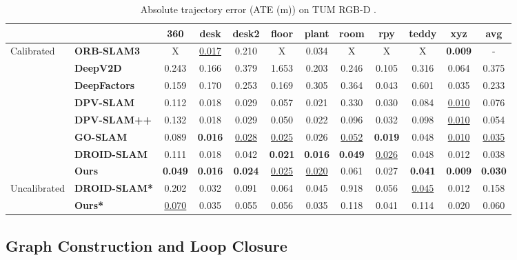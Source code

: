 \documentclass[10pt,twocolumn,letterpaper]{article}
\begin{document}
\begin{table}[t]
\centering
\caption{Absolute trajectory error (ATE (m)) on TUM RGB-D \cite{sturm_benchmark_2012}.}\label{tab:tum_ate}
\scriptsize
\begin{tabular}{l|lcccccccccc} %
& &\textbf{360} &\textbf{desk} &\textbf{desk2} &\textbf{floor} &\textbf{plant} &\textbf{room } &\textbf{rpy} &\textbf{teddy} &\textbf{xyz} &\textbf{avg} \\
\hline
\multirow{8}{*}{Calibrated} &\textbf{ORB-SLAM3 \cite{campos_orbslam3_2021}} &X &\underline{0.017} &0.210 &X &0.034 &X &X &X &\textbf{0.009} &- \\
&\textbf{DeepV2D \cite{teed_deepv2d_2020}} &0.243 &0.166 &0.379 &1.653 &0.203 &0.246 &0.105 &0.316 &0.064 &0.375 \\
&\textbf{DeepFactors \cite{czarnowski_deepfactors_2020}} &0.159 &0.170 &0.253 &0.169 &0.305 &0.364 &0.043 &0.601 &0.035 &0.233 \\
&\textbf{DPV-SLAM \cite{lipson2024deep}} &0.112 &0.018 &0.029 &0.057 &0.021 &0.330 &0.030 &0.084 &\underline{0.010} &0.076 \\
&\textbf{DPV-SLAM++ \cite{lipson2024deep}} &0.132 &0.018 &0.029 &0.050 &0.022 &0.096 &0.032 &0.098 &\underline{0.010} &0.054 \\
&\textbf{GO-SLAM \cite{zhang2023goslam}} &0.089 &\textbf{0.016} &\underline{0.028} &\underline{0.025} &0.026 &\underline{0.052} &\textbf{0.019} &0.048 &\underline{0.010} &\underline{0.035} \\
&\textbf{DROID-SLAM \cite{teed_droid_2021}} &0.111 &0.018 &0.042 &\textbf{0.021} &\textbf{0.016} &\textbf{0.049} &\underline{0.026} &0.048 &0.012 &0.038 \\
&\textbf{Ours} &\textbf{0.049} &\textbf{0.016} &\textbf{0.024} &\underline{0.025} &\underline{0.020} &0.061 &0.027 &\textbf{0.041} &\textbf{0.009} &\textbf{0.030} \\
\hline
\multirow{2}{*}{Uncalibrated} &\textbf{DROID-SLAM* \cite{teed_droid_2021, veicht2024geocalib}} &0.202 &0.032 &0.091 &0.064 &0.045 &0.918 &0.056 &\underline{0.045} &0.012 &0.158 \\
&\textbf{Ours*} &\underline{0.070} &0.035 &0.055 &0.056 &0.035 &0.118 &0.041 &0.114 &0.020 &0.060 \\
\bottomrule
\end{tabular}
\end{table}


\subsection{Graph Construction and Loop Closure}
\end{document}
